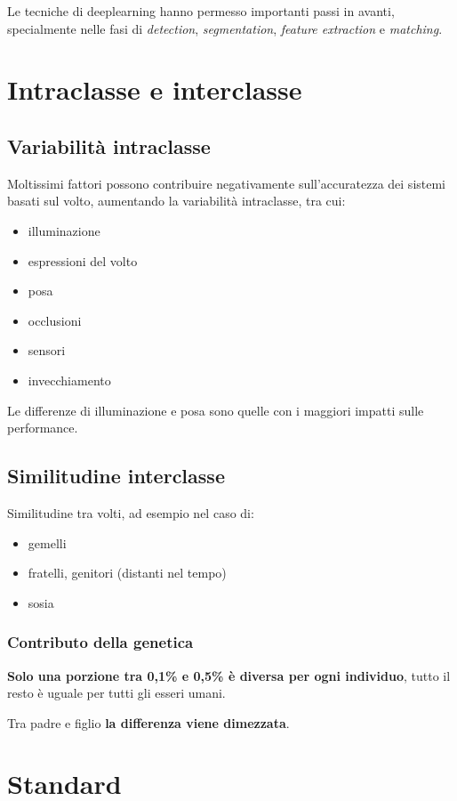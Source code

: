 \documentclass{report}
\begin{document}
\noindent Le tecniche di deeplearning hanno permesso importanti passi in avanti, specialmente
nelle fasi di \textit{detection}, \textit{segmentation}, \textit{feature extraction} e \textit{matching}.

\section{Intraclasse e interclasse}
\subsection{Variabilità intraclasse}
Moltissimi fattori possono contribuire negativamente sull'accuratezza dei sistemi basati sul 
volto, aumentando la variabilità intraclasse, tra cui:
\begin{itemize}
    \item illuminazione 
    \item espressioni del volto 
    \item posa
    \item occlusioni 
    \item sensori 
    \item invecchiamento 
\end{itemize}

\noindent Le differenze di illuminazione e posa sono quelle 
con i maggiori impatti sulle performance.

\subsection{Similitudine interclasse}
Similitudine tra volti, ad esempio nel caso di:
\begin{itemize}
    \item gemelli 
    \item fratelli, genitori (distanti nel tempo)
    \item sosia
\end{itemize}

\subsubsection{Contributo della genetica}
\textbf{Solo una porzione tra 0,1\% e 0,5\% è diversa per ogni individuo}, tutto 
il resto è uguale per tutti gli esseri umani.

\noindent Tra padre e figlio \textbf{la differenza viene dimezzata}.

\section{Standard}
\end{document}

